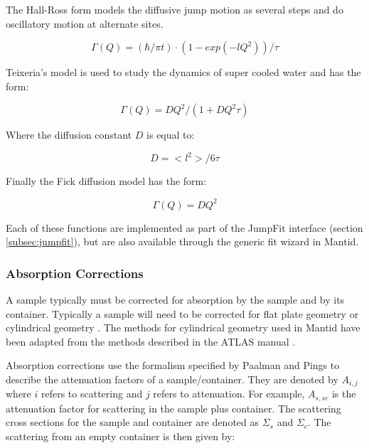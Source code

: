 \documentclass[paper=a4, fontsize=11pt]{scrartcl}	%
\numberwithin{equation}{section}															%
\numberwithin{figure}{section}																%
\numberwithin{table}{section}																%
\begin{document}
The Hall-Ross \cite{hall1981incoherent} form models the diffusive jump motion as several steps and do oscillatory motion at alternate sites.

\begin{equation}
\Gamma(Q) = (\hbar/\pi t) \cdot (1-exp(-lQ^2))/\tau
\end{equation}

Teixeria's model \cite{teixeira1985experimental} is used to study the dynamics of super cooled water and has the form:

\begin{equation}
\Gamma(Q) = DQ^2/(1 + DQ^2\tau)
\end{equation}

Where the diffusion constant $D$ is equal to:

\begin{equation}
D=<l^2>/6\tau
\end{equation}

Finally the Fick diffusion model \cite{fick1855v} has the form:

\begin{equation}
\Gamma(Q) = DQ^2
\end{equation}

Each of these functions are implemented as part of the JumpFit interface (section \ref{subsec:jumpfit}), but are also available through the generic fit wizard in Mantid.

\subsubsection{Absorption Corrections}
A sample typically must be corrected for absorption by the sample and by its container. Typically a sample will need to be corrected for flat plate geometry \cite{ccarlile1974} or cylindrical geometry \cite{aksoper1989}. The methods for cylindrical geometry used in Mantid have been adapted from the methods described in the ATLAS manual \cite{aksoper1989}.

Absorption corrections use the formalism specified by Paalman and Pings \cite{hhpaalman1962} to describe the attenuation factors of a sample/container. They are denoted by $A_{i,j}$ where $i$ refers to scattering and $j$ refers to attenuation. For example, $A_{s,sc}$ is the attenuation factor for scattering in the sample plus container. The scattering cross sections for the sample and container are denoted as $\Sigma_s$ and $\Sigma_c$. The scattering from an empty container is then given by:
\end{document}
